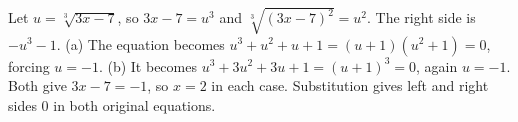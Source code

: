 Let $u=\sqrt[3]{3x-7}$, so $3x-7=u^3$ and $\sqrt[3]{(3x-7)^2}=u^2$. The right side is $-u^3-1$. (a) The equation becomes $u^3+u^2+u+1=(u+1)(u^2+1)=0$, forcing $u=-1$. (b) It becomes $u^3+3u^2+3u+1=(u+1)^3=0$, again $u=-1$. Both give $3x-7=-1$, so $\boxed{x=2}$ in each case. Substitution gives left and right sides $0$ in both original equations.
